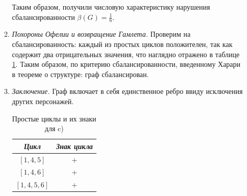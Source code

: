 \documentclass{article}
\begin{document}
\begin{enumerate}
\begin{enumerate}
        Таким образом, получили числовую характеристику нарушения сбалансированности  $\beta(G) = \frac{1}{6}$.
        
        \item \textit{Похороны Офелии и возвращение Гамлета.} Проверим на сбалансированность: каждый из простых циклов положителен, так как содержит два отрицательных значения, что наглядно отражено в таблице \ref{tab:21_cycles_2}. Таким образом, по критерию сбалансированности, введенному Харари в теореме о структуре: граф сбалансирован.

        \item \textit{Заключение.} Граф включает в себя единственное ребро ввиду исключения других персонажей.

        \begin{table}[ht]
        \centering
        \begin{tabular}{c|c}
            \textit{Цикл} & \textit{Знак цикла} \\ \hline
            $[1,4,5]$ & + \\
            $[1,4,6]$ & + \\
            $[1,4,5,6]$ & + \\ \hline
        \end{tabular}
        \caption{Простые циклы и их знаки для c)}
        \label{tab:21_cycles_2}
        \end{table}
    \end{enumerate}



\end{enumerate}
\end{document}
